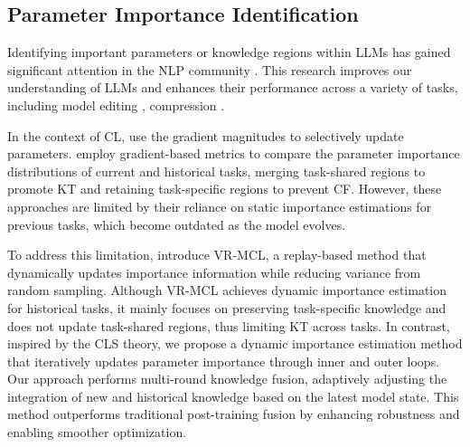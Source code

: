 \subsection{Parameter Importance Identification}
Identifying important parameters or knowledge regions within LLMs has gained significant attention in the NLP community \cite{zhao2023does, liu2023good, feng2024tasl2, xu2024parenting, shi2024understanding}. This research improves our understanding of LLMs and enhances their performance across a variety of tasks, including model editing \cite{wang2024editing}, compression \cite{zhang2023adalora}.

In the context of CL, \citet{du2024unlocking} use the gradient magnitudes to selectively update parameters. \citet{feng2024tasl} employ gradient-based metrics to compare the parameter importance distributions of current and historical tasks, merging task-shared regions to promote KT and retaining task-specific regions to prevent CF.
However, these approaches are limited by their reliance on static importance estimations for previous tasks, which become outdated as the model evolves. 

To address this limitation, \citet{wu2024meta} introduce VR-MCL, a replay-based method that dynamically updates importance information while reducing variance from random sampling. 
Although VR-MCL achieves dynamic importance estimation for historical tasks, it mainly focuses on preserving task-specific knowledge and does not update task-shared regions, thus limiting KT across tasks.
In contrast, inspired by the CLS theory, we propose a dynamic importance estimation method that iteratively updates parameter importance through inner and outer loops.
Our approach performs multi-round knowledge fusion, adaptively adjusting the integration of new and historical knowledge based on the latest model state. This method outperforms traditional post-training fusion by enhancing robustness and enabling smoother optimization.

